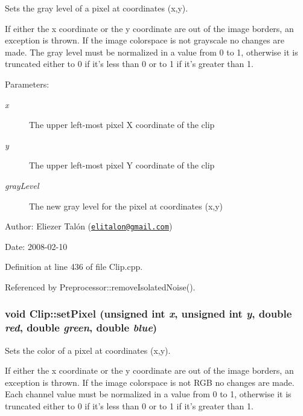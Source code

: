 Sets the gray level of a pixel at coordinates (x,y). 

If either the x coordinate or the y coordinate are out of the image borders, an exception is thrown. If the image colorspace is not grayscale no changes are made. The gray level must be normalized in a value from 0 to 1, otherwise it is truncated either to 0 if it's less than 0 or to 1 if it's greater than 1.

\begin{Desc}
\item[Parameters:]
\begin{description}
\item[{\em x}]The upper left-most pixel X coordinate of the clip \item[{\em y}]The upper left-most pixel Y coordinate of the clip \item[{\em grayLevel}]The new gray level for the pixel at coordinates (x,y)\end{description}
\end{Desc}
\begin{Desc}
\item[Author:]Eliezer Talón (\href{mailto:elitalon@gmail.com}{\tt elitalon@gmail.com}) \end{Desc}
\begin{Desc}
\item[Date:]2008-02-10 \end{Desc}


Definition at line 436 of file Clip.cpp.

Referenced by Preprocessor::removeIsolatedNoise().\hypertarget{class_clip_1e28a9ed2676460de4b5b9ab1b985f4c}{
\subsubsection[setPixel]{\setlength{\rightskip}{0pt plus 5cm}void Clip::setPixel (unsigned int {\em x}, \/  unsigned int {\em y}, \/  double {\em red}, \/  double {\em green}, \/  double {\em blue})}}
\label{class_clip_1e28a9ed2676460de4b5b9ab1b985f4c}


Sets the color of a pixel at coordinates (x,y). 

If either the x coordinate or the y coordinate are out of the image borders, an exception is thrown. If the image colorspace is not RGB no changes are made. Each channel value must be normalized in a value from 0 to 1, otherwise it is truncated either to 0 if it's less than 0 or to 1 if it's greater than 1.

